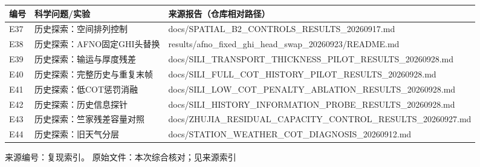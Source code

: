 \documentclass[UTF8,a4paper,landscape,10pt]{ctexart}
\begin{document}
\begin{center}\small
\begin{adjustbox}{max totalheight=0.58\textheight,max width=\linewidth}
\begin{minipage}{\linewidth}\begin{tabularx}{\linewidth}{>{\hsize=0.3000\hsize\raggedright\arraybackslash}X>{\hsize=0.9000\hsize\raggedright\arraybackslash}X>{\hsize=1.8000\hsize\raggedright\arraybackslash}X}\toprule
\textbf{编号} & \textbf{科学问题/\allowbreak{}实验} & \textbf{来源报告（仓库相对路径）} \\ \midrule
E37 & 历史探索：空间排列控制 & docs/\allowbreak{}SPATIAL\_\allowbreak{}B2\_\allowbreak{}CONTROLS\_\allowbreak{}RESULTS\_\allowbreak{}20260917.md \\
E38 & 历史探索：AFNO固定GHI头替换 & results/\allowbreak{}afno\_\allowbreak{}fixed\_\allowbreak{}ghi\_\allowbreak{}head\_\allowbreak{}swap\_\allowbreak{}20260923/\allowbreak{}README.md \\
E39 & 历史探索：输运与厚度残差 & docs/\allowbreak{}SILI\_\allowbreak{}TRANSPORT\_\allowbreak{}THICKNESS\_\allowbreak{}PILOT\_\allowbreak{}RESULTS\_\allowbreak{}20260928.md \\
E40 & 历史探索：完整历史与重复末帧 & docs/\allowbreak{}SILI\_\allowbreak{}FULL\_\allowbreak{}COT\_\allowbreak{}HISTORY\_\allowbreak{}PILOT\_\allowbreak{}RESULTS\_\allowbreak{}20260928.md \\
E41 & 历史探索：低COT惩罚消融 & docs/\allowbreak{}SILI\_\allowbreak{}LOW\_\allowbreak{}COT\_\allowbreak{}PENALTY\_\allowbreak{}ABLATION\_\allowbreak{}RESULTS\_\allowbreak{}20260928.md \\
E42 & 历史探索：历史信息探针 & docs/\allowbreak{}SILI\_\allowbreak{}HISTORY\_\allowbreak{}INFORMATION\_\allowbreak{}PROBE\_\allowbreak{}RESULTS\_\allowbreak{}20260928.md \\
E43 & 历史探索：竺家残差容量对照 & docs/\allowbreak{}ZHUJIA\_\allowbreak{}RESIDUAL\_\allowbreak{}CAPACITY\_\allowbreak{}CONTROL\_\allowbreak{}RESULTS\_\allowbreak{}20260927.md \\
E44 & 历史探索：旧天气分层 & docs/\allowbreak{}STATION\_\allowbreak{}WEATHER\_\allowbreak{}COT\_\allowbreak{}DIAGNOSIS\_\allowbreak{}20260912.md \\
\bottomrule\end{tabularx}\end{minipage}\end{adjustbox}\end{center}
\vfill{\scriptsize\color{muted} 来源编号：复现索引。 原始文件：本次综合核对；见来源索引}\par
\end{document}
